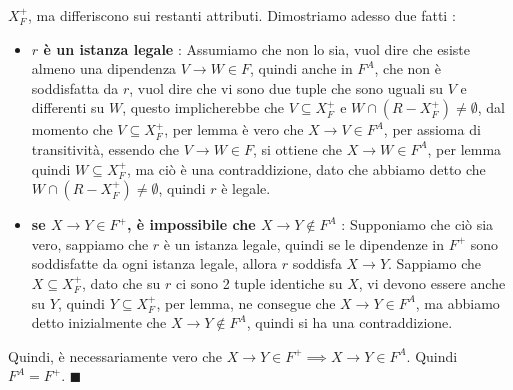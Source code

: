 \documentclass[12pt, letterpaper]{article}
\begin{document}
\(X^+_F\), ma differiscono sui restanti attributi. Dimostriamo adesso due fatti :\begin{itemize}
    \item \textbf{\(r\) è un istanza legale} : Assumiamo che non lo sia, vuol dire che esiste almeno una dipendenza \(V\rightarrow W\in F\),
    quindi anche in \(F^A\), che non è soddisfatta da \(r\), vuol dire che vi sono due tuple che sono uguali su \(V\) e 
    differenti su \(W\), questo implicherebbe che \(V\subseteq X^+_F\) e \(W\cap (R-X^+_F)\ne\emptyset\), dal momento che 
    \(V\subseteq X^+_F\), per lemma è vero che \(X\rightarrow V\in F^A\), per assioma di transitività,  
    essendo che \(V\rightarrow W\in F\), si ottiene che \(X\rightarrow W\in F^A\), per lemma quindi \(W\subseteq X^+_F\), 
    ma ciò è una contraddizione, dato che abbiamo detto che  \(W\cap (R-X^+_F)\ne\emptyset\), quindi \(r\) è legale.
    \item \textbf{ se \(X\rightarrow Y \in F^+\), è impossibile che \(X\rightarrow Y \notin F^A\)} : Supponiamo che 
    ciò sia vero, sappiamo che \(r\) è un istanza legale, quindi se le dipendenze in \(F^+\) sono soddisfatte 
    da ogni istanza legale, allora \(r\) soddisfa \(X\rightarrow Y\). Sappiamo che \(X\subseteq X^+_F\), dato 
    che su \(r\) ci sono 2 tuple identiche su \(X\), vi devono essere anche su \(Y\), quindi \(Y\subseteq X^+_F\), 
    per lemma, ne consegue che \(X\rightarrow Y \in F^A\), ma abbiamo detto inizialmente che \(X\rightarrow Y \notin F^A\), 
    quindi si ha una contraddizione.
\end{itemize}
Quindi, è necessariamente vero che  \(X\rightarrow Y \in F^+ \implies X\rightarrow Y \in F^A\). Quindi \(F^A=F^+\). \(\blacksquare\)
\end{document}
